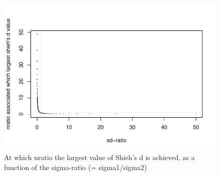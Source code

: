 \documentclass[
  man]{apa6}
\begin{document}
\begin{figure}
\centering
\includegraphics{Appendix1_files/figure-latex/SHIEH6-1.pdf}
\caption{\label{fig:SHIEH6}At which nratio the largest value of Shieh's d is achieved, as a function of the sigma-ratio (= sigma1/sigma2)}
\end{figure}
\end{document}
